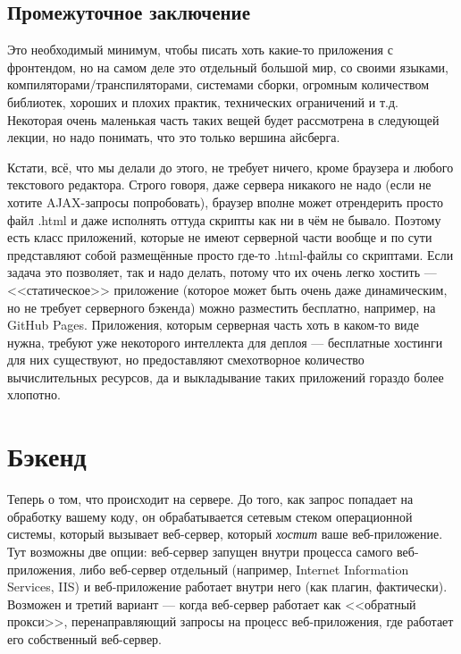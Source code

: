 \documentclass[a5paper]{article}
\begin{document}
\subsection{Промежуточное заключение}

Это необходимый минимум, чтобы писать хоть какие-то приложения с фронтендом, но на самом деле это отдельный большой мир, со своими языками, компиляторами/транспиляторами, системами сборки, огромным количеством библиотек, хороших и плохих практик, технических ограничений и т.д. Некоторая очень маленькая часть таких вещей будет рассмотрена в следующей лекции, но надо понимать, что это только вершина айсберга.

Кстати, всё, что мы делали до этого, не требует ничего, кроме браузера и любого текстового редактора. Строго говоря, даже сервера никакого не надо (если не хотите AJAX-запросы попробовать), браузер вполне может отрендерить просто файл .html и даже исполнять оттуда скрипты как ни в чём не бывало. Поэтому есть класс приложений, которые не имеют серверной части вообще и по сути представляют собой размещённые просто где-то .html-файлы со скриптами. Если задача это позволяет, так и надо делать, потому что их очень легко хостить --- <<статическое>> приложение (которое может быть очень даже динамическим, но не требует серверного бэкенда) можно разместить бесплатно, например, на GitHub Pages. Приложения, которым серверная часть хоть в каком-то виде нужна, требуют уже некоторого интеллекта для деплоя --- бесплатные хостинги для них существуют, но предоставляют смехотворное количество вычислительных ресурсов, да и выкладывание таких приложений гораздо более хлопотно.

\section{Бэкенд}

Теперь о том, что происходит на сервере. До того, как запрос попадает на обработку вашему коду, он обрабатывается сетевым стеком операционной системы, который вызывает веб-сервер, который \emph{хостит} ваше веб-приложение. Тут возможны две опции: веб-сервер запущен внутри процесса самого веб-приложения, либо веб-сервер отдельный (например, Internet Information Services, IIS) и веб-приложение работает внутри него (как плагин, фактически). Возможен и третий вариант --- когда веб-сервер работает как <<обратный прокси>>, перенаправляющий запросы на процесс веб-приложения, где работает его собственный веб-сервер.
\end{document}
